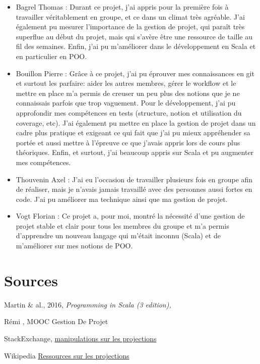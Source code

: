 \documentclass[a4paper, 12pt]{report}
\begin{document}
\begin{itemize}

\item
  Bagrel Thomas :
  Durant ce projet, j’ai appris pour la première fois à travailler véritablement en groupe, et ce dans un climat très agréable. J’ai également pu mesurer l’importance de la gestion de projet, qui paraît très superflue au début du projet, mais qui s’avère être une ressource de taille au fil des semaines. Enfin, j’ai pu m’améliorer dans le développement en Scala et en particulier en POO.
  
\item
  Bouillon Pierre :
  Grâce à ce projet, j'ai pu éprouver mes connaissances en git et surtout les parfaire: aider les autres membres, gérer le workflow et le mettre en place m'a permis de creuser un peu plus des notions que je ne connaissais parfois que trop vaguement.
  Pour le développement, j'ai pu approfondir mes compétences en tests (structure, notion et utilisation du coverage, etc).
  J'ai également pu mettre en place la gestion de projet dans un cadre plus pratique et exigeant ce qui fait que j'ai pu mieux appréhender sa portée et aussi mettre à l'épreuve ce que j'avais appris lors de cours plus théoriques.
  Enfin, et surtout, j'ai beaucoup appris sur Scala et pu augmenter mes compétences.
 
 
\item
  Thouvenin Axel :
  J’ai eu l’occasion de travailler plusieurs fois en groupe afin de réaliser, mais je n’avais jamais travaillé avec des personnes aussi fortes en code. J’ai pu améliorer ma technique ainsi que ma gestion de projet.

\item
  Vogt Florian :
  Ce projet a, pour moi, montré la nécessité d’une gestion de projet stable et clair pour tous les membres du groupe et m’a permis d’apprendre un nouveau langage qui m’était inconnu (Scala) et de m’améliorer sur mes notions de POO.


\end{itemize}


    
\part*{Sources}\label{part:sources}

Martin  \& al., 2016, \it{Programming in Scala} (3 edition), 

Rémi , MOOC Gestion De Projet

StackExchange, \href{https://gis.stackexchange.com/questions/10808/manually-transforming-rotated-lat-lon-to-regular-lat-lon}{manipulations sur les projections}

Wikipedia \href{https://fr.wikipedia.org/wiki/Projection_cylindrique_\%C3\%A9quidistante}{Ressources sur les projections}


\end{document}
